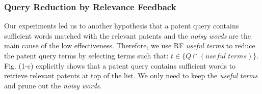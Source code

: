 \documentclass{sig-alternate}
\begin{document}

\subsubsection{Query Reduction by Relevance Feedback}
Our experiments led us to another hypothesis that a patent query contains sufficient words matched with the relevant patents and the {\em noisy words} are the main cause of the low effectiveness. Therefore, we use RF {\em useful terms} to reduce the patent query terms by selecting terms such that: $ t \in \{ Q\cap (useful \; terms)\} $. Fig. (1-c) explicitly shows that a patent query contains sufficient words to retrieve relevant patents at top of the list. We only need to keep the {\em useful terms} and prune out the {\em noisy words}.
\end{document}
